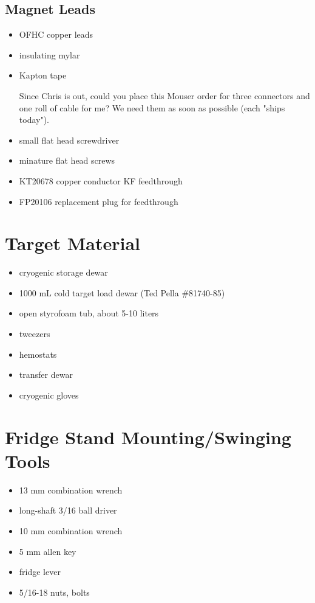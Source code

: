   \subsection{Magnet Leads}
\begin{itemize}
 \item OFHC copper leads
\item insulating mylar
\item Kapton tape

Since Chris is out, could you place this Mouser order for three connectors and one roll of cable for me?  We need them as soon as possible (each "ships today").
\item small flat head screwdriver
\item minature flat head screws
\item {} KT20678 copper conductor KF feedthrough
\item {} FP20106 replacement plug for feedthrough
\end{itemize}


\section{Target Material}
\begin{itemize}
 \item cryogenic storage \lnn{} dewar
\item 1000 mL cold target load dewar (Ted Pella \#81740-85)
\item open styrofoam tub, about 5-10 liters
\item tweezers
\item hemostats
\item \lnn{} transfer dewar
\item cryogenic gloves
\end{itemize}

\section{Fridge Stand Mounting/Swinging Tools}

\begin{itemize}
  \item 13 mm combination wrench
  \item long-shaft 3/16\inches{} ball driver
  \item 10 mm combination wrench
  \item 5 mm allen key
  \item fridge lever
  \item {} 5/16\inches{}-18 nuts, bolts
\end{itemize}


